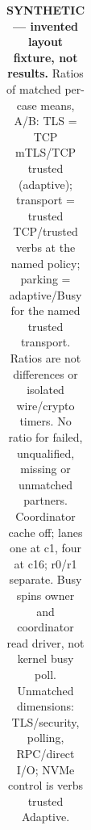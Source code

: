 \begin{table}[H]
\begin{tabular}{llllll}
\bottomrule\end{tabular}
\caption{\textbf{SYNTHETIC --- invented layout fixture, not results.} Ratios of matched per-case means, A/B: TLS = TCP mTLS/TCP trusted (adaptive); transport = trusted TCP/trusted verbs at the named policy; parking = adaptive/Busy for the named trusted transport. Ratios are not differences or isolated wire/crypto timers. No ratio for failed, unqualified, missing or unmatched partners. Coordinator cache off; lanes one at c1, four at c16; r0/r1 separate. Busy spins owner and coordinator read driver, not kernel busy poll. Unmatched dimensions: TLS/security, polling, RPC/direct I/O; NVMe control is verbs trusted Adaptive.}
\end{table}
